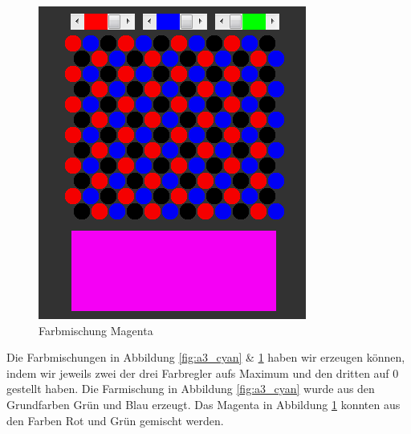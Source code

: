 \documentclass[a4paper]{article}
\begin{document}
\begin{figure}[H]
\begin{minipage}[b]{0.45\textwidth}
    	\includegraphics[width=0.9\columnwidth]{images/A3_magenta.PNG}
    	\centering
    	\caption{Farbmischung Magenta}
    	\label{fig:a3_magenta}
    \end{minipage}
\end{figure}

\noindent Die Farbmischungen in Abbildung \ref{fig:a3_cyan} \& \ref{fig:a3_magenta} haben wir erzeugen können, indem wir jeweils zwei der drei Farbregler aufs Maximum und den dritten auf 0 gestellt haben. Die Farmischung in Abbildung \ref{fig:a3_cyan} wurde aus den Grundfarben Grün und Blau erzeugt. Das Magenta in Abbildung \ref{fig:a3_magenta} konnten aus den Farben Rot und Grün gemischt werden.
\end{document}
